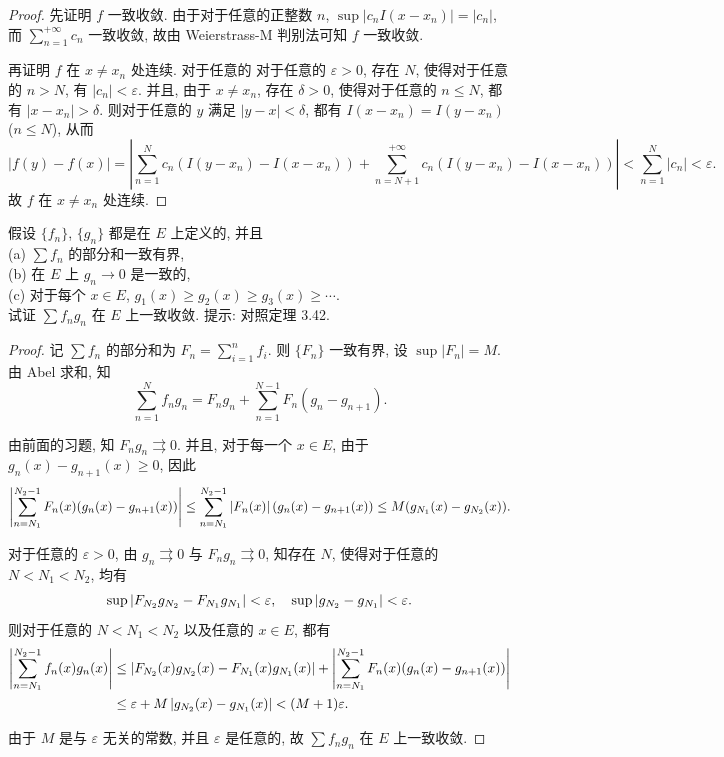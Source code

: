 \documentclass{article}
\begin{document}
\begin{proof}
  先证明 \( f \) 一致收敛. 由于对于任意的正整数 \( n \), \( \sup |c_nI(x-x_n)| =|c_n| \), 而 \( \sum_{n=1}^{+\infty} c_n \) 一致收敛, 故由 Weierstrass-M 判别法可知 \( f \) 一致收敛.

  再证明 \( f \) 在 \( x\ne x_n \) 处连续. 对于任意的 对于任意的 \( \varepsilon>0 \), 存在 \( N \), 使得对于任意的 \( n>N \), 有 \( |c_n|<\varepsilon \). 并且, 由于 \( x\ne x_n \), 存在 \( \delta>0 \), 使得对于任意的 \( n\le N \), 都有 \( |x-x_n|>\delta \). 则对于任意的 \( y \) 满足 \( |y-x|<\delta \), 都有 \( I(x-x_n)=I(y-x_n) \) (\( n\le N \)), 从而
  \[ |f(y)-f(x)| = \left| \sum_{n=1}^N c_n (I(y-x_n)-I(x-x_n)) + \sum_{n=N+1}^{+\infty} c_n (I(y-x_n)-I(x-x_n)) \right| < \sum_{n=1}^{N}|c_n| < \varepsilon. \]
  故 \( f \) 在 \( x\ne x_n \) 处连续.
\end{proof}



\begin{problem}[7-11]
假设 $\{f_n\}$, $\{g_n\}$ 都是在 $E$ 上定义的, 并且\\
 (a) $\sum f_n$ 的部分和一致有界,\\
 (b) 在 $E$ 上 $g_n \to 0$ 是一致的,\\
 (c) 对于每个 $x \in E$, $g_1(x) \ge g_2(x) \ge g_3(x) \ge \cdots$.\\
试证 $\sum f_n g_n$ 在 $E$ 上一致收敛. 提示: 对照定理 3.42.
\end{problem}

\begin{proof}
  记 \( \sum f_n \) 的部分和为 \( F_n=\sum_{i=1}^{n}f_i \). 则 \( \{F_n\} \) 一致有界, 设 \( \sup |F_n| =M \). 由 Abel 求和, 知
  \[ \sum_{n=1}^{N} f_ng_n 
  = F_ng_n + \sum_{n=1}^{N-1}F_n(g_n-g_{n+1}). \]

  由前面的习题, 知 \( F_ng_n \rightrightarrows 0 \). 并且, 对于每一个 \( x\in E \), 由于 \( g_n(x)-g_{n+1}(x)\ge 0 \), 因此
  \[ \left|\sum_{n=N_1}^{N_2-1}F_n(x)(g_n(x)-g_{n+1}(x))\right| 
  \le \sum_{n=N_1}^{N_2-1}\left|F_n(x)\right|(g_n(x)-g_{n+1}(x))
  \le M(g_{N_1}(x)-g_{N_2}(x)). \]

  对于任意的 \( \varepsilon>0 \), 由 \( g_n \rightrightarrows 0 \) 与 \( F_ng_n \rightrightarrows 0 \), 知存在 \( N \), 使得对于任意的 \( N<N_1<N_2 \), 均有
  \[ \sup\left|F_{N_2}g_{N_2}-F_{N_1}g_{N_1}\right| < \varepsilon, \quad 
  \sup\left|g_{N_2}-g_{N_1}\right| < \varepsilon. \]
  则对于任意的 \( N<N_1<N_2 \) 以及任意的 \( x\in E \), 都有
  \begin{align*}
    \left|\sum_{n=N_1}^{N_2-1} f_n(x)g_n(x) \right|
    & \le \left| F_{N_2}(x)g_{N_2}(x) - F_{N_1}(x)g_{N_1}(x) \right| 
    + \left|\sum_{n=N_1}^{N_2-1} F_{n}(x)(g_n(x)-g_{n+1}(x))\right|  \\
    & \le \varepsilon + M\left|g_{N_2}(x)-g_{N_1}(x)\right| < (M+1)\varepsilon.
  \end{align*}

  由于 \( M \) 是与 \( \varepsilon \) 无关的常数, 并且 \( \varepsilon \) 是任意的, 故 \( \sum f_ng_n \) 在 \( E \) 上一致收敛.
\end{proof}
\end{document}
